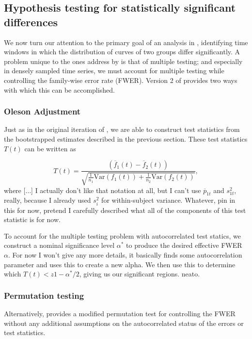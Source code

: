 \subsection{Hypothesis testing for statistically significant differences}

We now turn our attention to the primary goal of an analysis in , identifying time windows in which the distribution of curves of two groups differ significantly. A problem unique to the ones address by  is that of multiple testing; and especially in densely sampled time series, we must account for multiple testing while controlling the family-wise error rate (FWER). Version 2 of  provides two ways with which this can be accomplished.

\subsubsection{Oleson Adjustment}

Just as in the original iteration of , we are able to construct test statistics from the bootstrapped estimates described in the previous section. These test statistics $T(t)$ can be written as 

\begin{equation}\label{eq:test_statistic}
T(t) = \frac{(\overline{f}_{1}(t) - \overline{f}_{2}(t))}{\sqrt{\frac{1}{n_1} \text{Var}(f_1(t)) + \frac{1}{n_2} \text{Var}(f_2(t))}},
\end{equation}
where [$\dots$] I actually don't like that notation at all, but I can't use $\overline{p}_{1t}$ and $s_{1t}^2$, really, because I already used $s_i^2$ for within-subject variance. Whatever, pin in this for now, pretend I carefully described what all of the components of this test statistic is for now.

To account for the multiple testing problem with autocorrelated test statics, we construct a nominal significance level $\alpha^*$ to produce the desired effective FWER $\alpha$. For now I won't give any more details, it basically finds some autocorrelation parameter and uses this to create a new alpha.  We then use this to determine which $T(t) < z{1 -\alpha^*/2}$, giving us our significant regions. neato.

\subsubsection{Permutation testing}

Alternatively,  provides a modified permutation test for controlling the FWER without any additional assumptions on the autocorrelated status of the errors or test statistics. 

